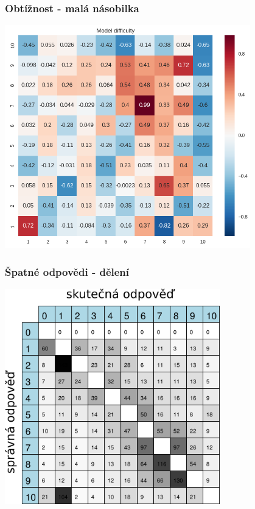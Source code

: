 \documentclass[xcolor=svgnames]{beamer}
\begin{document}
\begin{frame}
	\frametitle{Obtížnost - malá násobilka}
	\begin{center}
		\includegraphics[width=0.8\textwidth]{img/multiplication_difficulty}
	\end{center}
\end{frame}
\begin{frame}
	\frametitle{Špatné odpovědi - dělení}
	\begin{center}
		\includegraphics[width=0.7\textwidth]{img/confusion_table_10_div.png}
	\end{center}
\end{frame}
\end{document}
